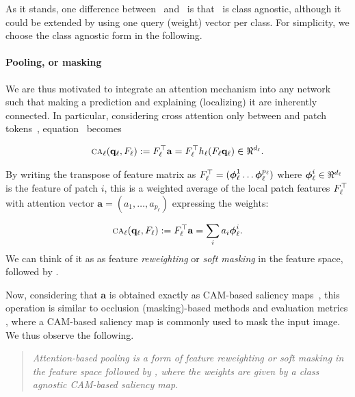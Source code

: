 As it stands, one difference between~ and~ is that~ is class 
agnostic, although it could be extended by using one query (weight) vector per class. For simplicity, 
we choose the class agnostic form in the following. %

\paragraph{Pooling, or masking}

We are thus motivated to integrate an attention mechanism into any network such that making a 
prediction and explaining (localizing) it are inherently connected. In particular, considering 
cross attention only between \cls and patch tokens~, equation~ becomes

\begin{align}
	\ca_\ell(\vq_\ell, F_\ell) \defn F_\ell\tran \mathbf{a} = F_\ell\tran h_\ell(F_\ell \vq_\ell) 
	\in \real^{d_\ell}.
\label{eq:CA}
\end{align}

By writing the transpose of feature matrix as $F_\ell^\top = ({\boldsymbol{\phi}}_\ell^1 \dots 
{\boldsymbol{\phi}}_\ell^{p_\ell})$ where $\vphi_\ell^i \in \real^{d_\ell}$ is the feature of patch $i$, 
this is a weighted average of the local patch features $F_\ell^\top$ with attention vector 
$\mathbf{a} = (a_1, \dots, a_{p_\ell})$ expressing the weights:

\begin{align}
	{\textsc{ca}}_\ell(\mathbf{q}_\ell, F_\ell) \mathrel{:=} F_\ell^\top \mathbf{a} = \sum_i a_i {\boldsymbol{\phi}}_\ell^i.
\label{eq:CA-gap}
\end{align}
We can think of it as as feature \emph{reweighting} or \emph{soft masking} in the feature space, 
followed by \gap.

Now, considering that $\mathbf{a}$ is obtained exactly as CAM-based saliency maps~, 
this operation is similar to occlusion (masking)-based methods \autocite{petsiuk2018rise, 
fong2017interpretable, fong2019understanding, schulz2020restricting, ribeiro2016should,
wang2020score, zhang2023opti} and evaluation metrics \autocite{chattopadhay2018grad, 
petsiuk2018rise}, where a CAM-based saliency map is commonly used to mask the input image. 
We thus observe the following.

\begin{quote}
	\emph{Attention-based pooling is a form of feature reweighting or soft masking in the feature 
	space followed by \gap, where the weights are given by a class agnostic CAM-based saliency map.}
\end{quote}

%
